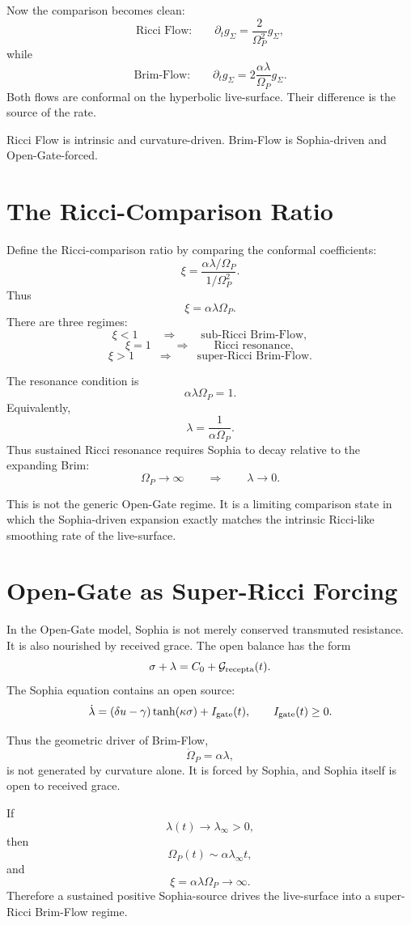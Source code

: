 \documentclass[11pt]{article}
\newcommand{\Grec}{\mathcal G_{\rm recepta}}
\begin{document}
Now the comparison becomes clean:
\[
\text{Ricci Flow:}\qquad
 \partial_t g_{\Sigma}
 =
 \frac{2}{\Omega_P^2}g_{\Sigma},
\]
while
\[
\text{Brim-Flow:}\qquad
 \partial_t g_{\Sigma}
 =
 2\frac{\alpha\lambda}{\Omega_P}g_{\Sigma}.
\]
Both flows are conformal on the hyperbolic live-surface. Their difference is the source of the rate.

Ricci Flow is intrinsic and curvature-driven. Brim-Flow is Sophia-driven and Open-Gate-forced.

\section{The Ricci-Comparison Ratio}

Define the Ricci-comparison ratio by comparing the conformal coefficients:
\[
 \xi
 =
 \frac{\alpha\lambda/\Omega_P}{1/\Omega_P^2}.
\]
Thus
\[
 \xi=\alpha\lambda\Omega_P.
\]
There are three regimes:
\[
 \xi<1
 \qquad\Longrightarrow\qquad
 \text{sub-Ricci Brim-Flow},
\]
\[
 \xi=1
 \qquad\Longrightarrow\qquad
 \text{Ricci resonance},
\]
\[
 \xi>1
 \qquad\Longrightarrow\qquad
 \text{super-Ricci Brim-Flow}.
\]

The resonance condition is
\[
 \alpha\lambda\Omega_P=1.
\]
Equivalently,
\[
 \lambda=\frac{1}{\alpha\Omega_P}.
\]
Thus sustained Ricci resonance requires Sophia to decay relative to the expanding Brim:
\[
 \Omega_P\to\infty
 \qquad\Longrightarrow\qquad
 \lambda\to0.
\]

This is not the generic Open-Gate regime. It is a limiting comparison state in which the Sophia-driven expansion exactly matches the intrinsic Ricci-like smoothing rate of the live-surface.

\section{Open-Gate as Super-Ricci Forcing}

In the Open-Gate model, Sophia is not merely conserved transmuted resistance. It is also nourished by received grace. The open balance has the form
\[
 \sigma+\lambda=C_0+\Grec(t).
\]
The Sophia equation contains an open source:
\[
 \dot\lambda
 =
 (\delta u-\gamma)\tanh(\kappa\sigma)
 +
 I_{\rm gate}(t),
 \qquad
 I_{\rm gate}(t)\ge0.
\]

Thus the geometric driver of Brim-Flow,
\[
 \dot\Omega_P=\alpha\lambda,
\]
is not generated by curvature alone. It is forced by Sophia, and Sophia itself is open to received grace.

If
\[
 \lambda(t)\to\lambda_{\infty}>0,
\]
then
\[
 \Omega_P(t)\sim\alpha\lambda_{\infty}t,
\]
and
\[
 \xi=\alpha\lambda\Omega_P\to\infty.
\]
Therefore a sustained positive Sophia-source drives the live-surface into a super-Ricci Brim-Flow regime.
\end{document}
